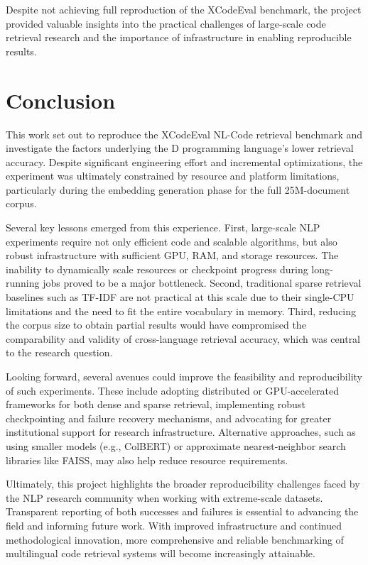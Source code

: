 \documentclass[12pt]{article}
\begin{document}
Despite not achieving full reproduction of the XCodeEval benchmark, the project provided valuable insights into the practical challenges of large-scale code retrieval research and the importance of infrastructure in enabling reproducible results.


\section{Conclusion}






This work set out to reproduce the XCodeEval NL-Code retrieval benchmark and investigate the factors underlying the D programming language's lower retrieval accuracy. Despite significant engineering effort and incremental optimizations, the experiment was ultimately constrained by resource and platform limitations, particularly during the embedding generation phase for the full 25M-document corpus.

Several key lessons emerged from this experience. First, large-scale NLP experiments require not only efficient code and scalable algorithms, but also robust infrastructure with sufficient GPU, RAM, and storage resources. The inability to dynamically scale resources or checkpoint progress during long-running jobs proved to be a major bottleneck. Second, traditional sparse retrieval baselines such as TF-IDF are not practical at this scale due to their single-CPU limitations and the need to fit the entire vocabulary in memory. Third, reducing the corpus size to obtain partial results would have compromised the comparability and validity of cross-language retrieval accuracy, which was central to the research question.

Looking forward, several avenues could improve the feasibility and reproducibility of such experiments. These include adopting distributed or GPU-accelerated frameworks for both dense and sparse retrieval, implementing robust checkpointing and failure recovery mechanisms, and advocating for greater institutional support for research infrastructure. Alternative approaches, such as using smaller models (e.g., ColBERT) or approximate nearest-neighbor search libraries like FAISS, may also help reduce resource requirements.

Ultimately, this project highlights the broader reproducibility challenges faced by the NLP research community when working with extreme-scale datasets. Transparent reporting of both successes and failures is essential to advancing the field and informing future work. With improved infrastructure and continued methodological innovation, more comprehensive and reliable benchmarking of multilingual code retrieval systems will become increasingly attainable.




\end{document}
